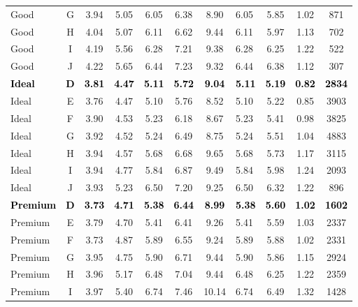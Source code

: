 \documentclass[
]{article}
\begin{document}
\begin{table}
{\begin{tabular}[t]{lcccccclccc}
Good & G & 3.94 & 5.05 & 6.05 & 6.38 & 8.90 & 6.05 & 5.85 & 1.02 & 871\\
Good & H & 4.04 & 5.07 & 6.11 & 6.62 & 9.44 & 6.11 & 5.97 & 1.13 & 702\\
Good & I & 4.19 & 5.56 & 6.28 & 7.21 & 9.38 & 6.28 & 6.25 & 1.22 & 522\\
Good & J & 4.22 & 5.65 & 6.44 & 7.23 & 9.32 & 6.44 & 6.38 & 1.12 & 307\\
\textcolor{black}{\textbf{Ideal}} & \textcolor{black}{\textbf{D}} & \textcolor{black}{\textbf{3.81}} & \textcolor{black}{\textbf{4.47}} & \textcolor{black}{\textbf{5.11}} & \textcolor{black}{\textbf{5.72}} & \textcolor{black}{\textbf{9.04}} & \textcolor{black}{\textbf{5.11}} & \textcolor{black}{\textbf{5.19}} & \textcolor{black}{\textbf{0.82}} & \textcolor{black}{\textbf{2834}}\\
\addlinespace
Ideal & E & 3.76 & 4.47 & 5.10 & 5.76 & 8.52 & 5.10 & 5.22 & 0.85 & 3903\\
Ideal & F & 3.90 & 4.53 & 5.23 & 6.18 & 8.67 & 5.23 & 5.41 & 0.98 & 3825\\
Ideal & G & 3.92 & 4.52 & 5.24 & 6.49 & 8.75 & 5.24 & 5.51 & 1.04 & 4883\\
Ideal & H & 3.94 & 4.57 & 5.68 & 6.68 & 9.65 & 5.68 & 5.73 & 1.17 & 3115\\
Ideal & I & 3.94 & 4.77 & 5.84 & 6.87 & 9.49 & 5.84 & 5.98 & 1.24 & 2093\\
\addlinespace
Ideal & J & 3.93 & 5.23 & 6.50 & 7.20 & 9.25 & 6.50 & 6.32 & 1.22 & 896\\
\textcolor{black}{\textbf{Premium}} & \textcolor{black}{\textbf{D}} & \textcolor{black}{\textbf{3.73}} & \textcolor{black}{\textbf{4.71}} & \textcolor{black}{\textbf{5.38}} & \textcolor{black}{\textbf{6.44}} & \textcolor{black}{\textbf{8.99}} & \textcolor{black}{\textbf{5.38}} & \textcolor{black}{\textbf{5.60}} & \textcolor{black}{\textbf{1.02}} & \textcolor{black}{\textbf{1602}}\\
Premium & E & 3.79 & 4.70 & 5.41 & 6.41 & 9.26 & 5.41 & 5.59 & 1.03 & 2337\\
Premium & F & 3.73 & 4.87 & 5.89 & 6.55 & 9.24 & 5.89 & 5.88 & 1.02 & 2331\\
Premium & G & 3.95 & 4.75 & 5.90 & 6.71 & 9.44 & 5.90 & 5.86 & 1.15 & 2924\\
\addlinespace
Premium & H & 3.96 & 5.17 & 6.48 & 7.04 & 9.44 & 6.48 & 6.25 & 1.22 & 2359\\
Premium & I & 3.97 & 5.40 & 6.74 & 7.46 & 10.14 & 6.74 & 6.49 & 1.32 & 1428\\

\end{tabular}}
\end{table}
\end{document}
